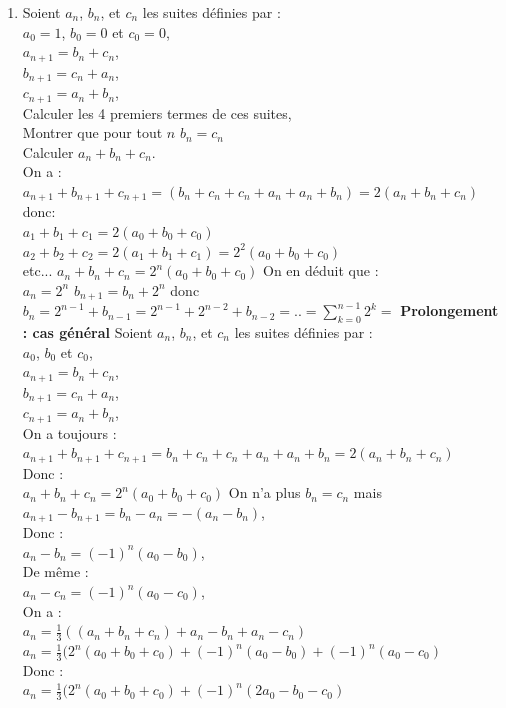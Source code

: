 \documentclass[a4paper,11pt]{book}
\begin{document}
\begin{enumerate}
\item Soient $a_n$, $b_n$, et $c_n$ les suites d\'efinies par :\\
$a_0=1$, $b_0=0$ et $c_0=0$,\\
$a_{n+1}=b_n+c_n$,\\
$b_{n+1}=c_n+a_n$,\\
$c_{n+1}=a_n+b_n$,\\
Calculer les 4 premiers termes de ces suites,\\
Montrer que pour tout $n$ $b_n=c_n$\\
Calculer $a_n+b_n+c_n$.\\
On a :\\
$a_{n+1}+b_{n+1}+c_{n+1}=(b_n+c_n+c_n+a_n+a_n+b_n)=2(a_n+b_n+c_n)$\\
donc:\\
$a_1+b_1+c_1=2(a_0+b_0+c_0)$\\
$a_2+b_2+c_2=2(a_1+b_1+c_1)=2^2(a_0+b_0+c_0)$\\
etc...
$a_n+b_n+c_n=2^n(a_0+b_0+c_0)$
On en d\'eduit que :\\
$a_n=2^n$
$b_{n+1}=b_n+2^n$
donc \\
$b_n=2^{n-1}+b_{n-1}=2^{n-1}+2^{n-2}+b_{n-2}=..=\sum_{k=0}^{n-1}2^k=$
{\bf Prolongement : cas g\'en\'eral}
Soient $a_n$, $b_n$, et $c_n$ les suites d\'efinies par :\\
$a_0$, $b_0$ et $c_0$,\\
$a_{n+1}=b_n+c_n$,\\
$b_{n+1}=c_n+a_n$,\\
$c_{n+1}=a_n+b_n$,\\
On a toujours :\\
$a_{n+1}+b_{n+1}+c_{n+1}=b_n+c_n+c_n+a_n+a_n+b_n=2(a_n+b_n+c_n)$\\
Donc :\\
$a_n+b_n+c_n=2^n(a_0+b_0+c_0)$
On n'a plus $b_n=c_n$ mais
$a_{n+1}-b_{n+1}=b_n-a_n=-(a_n-b_n)$,\\
Donc :\\
$a_n-b_n=(-1)^n(a_0-b_0)$,\\
De m\^eme :\\
$a_n-c_n=(-1)^n(a_0-c_0)$,\\
On a :\\
$a_n=\frac{1}{3}((a_n+b_n+c_n)+a_n-b_n+a_n-c_n)$\\
$a_n=\frac{1}{3}(2^n(a_0+b_0+c_0)+(-1)^n(a_0-b_0)+(-1)^n(a_0-c_0)$\\ 
Donc :\\
$a_n=\frac{1}{3}(2^n(a_0+b_0+c_0)+(-1)^n(2a_0-b_0-c_0)$\\ 

\end{enumerate}
\end{document}
